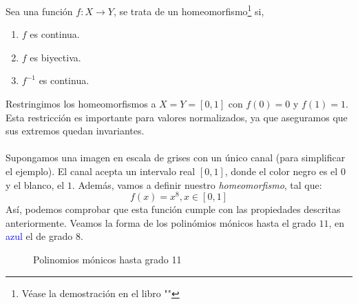 \begin{definition}
    Sea una función \(f:X\longrightarrow Y\), se trata de un homeomorfismo\footnote{Véase la demostración en el libro ""} si,
    \begin{enumerate}
        \item \(f\) es continua.
        \item \(f\) es biyectiva.
        \item \(f^{-1}\) es continua.
    \end{enumerate}
\end{definition}
Restringimos los homeomorfismos a \(X=Y=[0,1]\) con \(f(0)=0\) y \(f(1)=1\). Esta restricción es importante para valores normalizados, ya que aseguramos que sus extremos quedan invariantes.\\\\
Supongamos una imagen en escala de grises con un único canal (para simplificar el ejemplo). El canal acepta un intervalo real \([0, 1]\), donde el color negro es el \(0\) y el blanco, el \(1\).
Además, vamos a definir nuestro \textit{homeomorfismo}, tal que:
\[f(x)=x^8, x \in [0, 1]\]
Así, podemos comprobar que esta función cumple con las propiedades descritas anteriormente. Veamos la forma de los polinómios mónicos hasta el grado \(11\), en \textcolor{blue}{azul} el de grado \(8\).
\begin{figure}[H]
    \centering
    \captionsetup{justification=centering}%
    \caption{Polinomios mónicos hasta grado 11} \label{fig:M1}
\end{figure}

